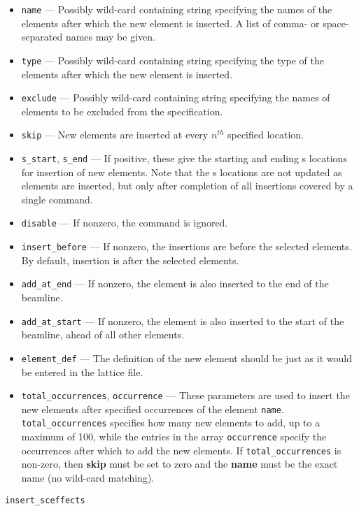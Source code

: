 \documentclass[11pt]{article}
\begin{document}
\begin{itemize}
\item \verb|name| --- Possibly wild-card containing string specifying the
   names of the elements after which the new element is inserted. A list of comma- or space-separated names may be given.
\item \verb|type| --- Possibly wild-card containing string specifying the
   type of the elements after which the new element is inserted.
\item \verb|exclude| --- Possibly wild-card containing string specifying 
   the names of elements to be excluded from the specification.
\item \verb|skip| --- New elements are inserted at every $n^{th}$ specified location.
\item \verb|s_start|, \verb|s_end| --- If positive, these give the starting and ending s locations for insertion of new elements.
  Note that the s locations are not updated as elements are inserted, but only after completion of all insertions covered by
  a single command.
\item \verb|disable| --- If nonzero, the command is ignored.
\item \verb|insert_before| --- If nonzero, the insertions are before the selected elements. By default, insertion is after
  the selected elements.
\item \verb|add_at_end| --- If nonzero, the element is also inserted to the end of the beamline.
\item \verb|add_at_start| --- If nonzero, the element is also inserted to the start of the beamline, ahead of all other elements.
\item \verb|element_def| --- The definition of the new element should be just as it would be entered in 
the lattice file.
\item \verb|total_occurrences|, \verb|occurrence| --- 
These parameters are used to insert the new elements after specified occurrences of 
the element \verb|name|.  \verb|total_occurrences| specifies how many new elements to add,
up to a maximum of 100, while the entries in the array \verb|occurrence| specify the occurrences
after which to add the new elements. If \verb|total_occurrences| is non-zero, then {\bf skip} must
be set to zero  and the {\bf name} must be the exact name (no wild-card matching). 
\end{itemize}

\newpage
\begin{center}{\Large\verb|insert_sceffects|}\end{center}
\end{document}
